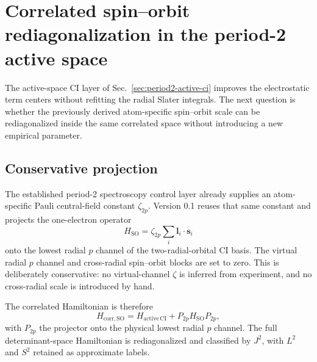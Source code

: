 \section{Correlated spin--orbit rediagonalization in the period-2 active space}
\label{sec:period2-correlated-spin-orbit}

The active-space CI layer of Sec.~\ref{sec:period2-active-ci} improves the electrostatic term centers without refitting the radial Slater integrals.  The next question is whether the previously derived atom-specific spin--orbit scale can be rediagonalized inside the same correlated space without introducing a new empirical parameter.

\subsection{Conservative projection}
The established period-2 spectroscopy control layer already supplies an atom-specific Pauli central-field constant $\zeta_{2p}$.  Version 0.1 reuses that same constant and projects the one-electron operator
\begin{equation}
H_{\mathrm{SO}}=\zeta_{2p}\sum_i \mathbf l_i\cdot\mathbf s_i
\end{equation}
onto the lowest radial $p$ channel of the two-radial-orbital CI basis.  The virtual radial $p$ channel and cross-radial spin--orbit blocks are set to zero.  This is deliberately conservative: no virtual-channel $\zeta$ is inferred from experiment, and no cross-radial scale is introduced by hand.

The correlated Hamiltonian is therefore
\begin{equation}
H_{\mathrm{corr,SO}}=H_{\mathrm{active\,CI}}+P_{2p}H_{\mathrm{SO}}P_{2p},
\end{equation}
with $P_{2p}$ the projector onto the physical lowest radial $p$ channel.  The full determinant-space Hamiltonian is rediagonalized and classified by $J^2$, with $L^2$ and $S^2$ retained as approximate labels.

